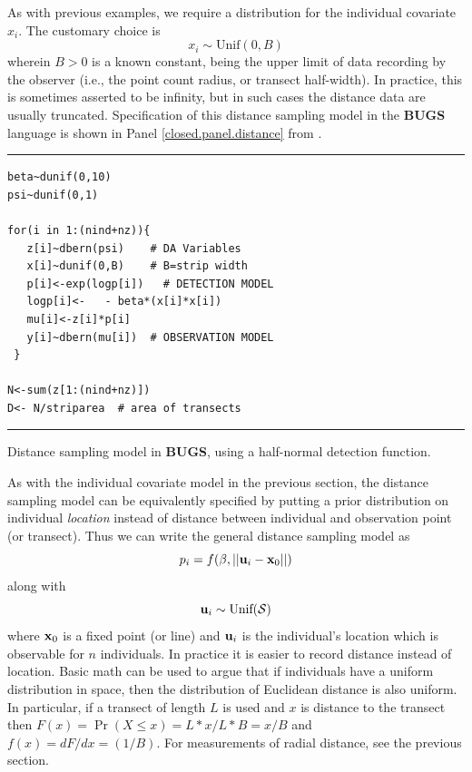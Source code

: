As with previous examples, we require a distribution for the
individual covariate $x_{i}$. The customary choice is
\[
x_{i} \sim \mbox{Unif}(0,B)
\]
wherein $B>0$ is a known constant, being the upper limit of data
recording by the observer (i.e., the point count radius, or transect
half-width). In practice, this is sometimes asserted to be infinity,
but in such cases the distance data are usually truncated.
Specification of this distance sampling model in the {\bf BUGS} language is
shown in Panel \ref{closed.panel.distance} from \citet{royle_dorazio:2008}.


\begin{panel}[htp]
\centering
\rule[0.15in]{\textwidth}{.03in}
\begin{minipage}{5in}
\begin{verbatim}
beta~dunif(0,10)
psi~dunif(0,1)

for(i in 1:(nind+nz)){
   z[i]~dbern(psi)    # DA Variables
   x[i]~dunif(0,B)    # B=strip width
   p[i]<-exp(logp[i])   # DETECTION MODEL
   logp[i]<-   - beta*(x[i]*x[i])
   mu[i]<-z[i]*p[i]
   y[i]~dbern(mu[i])  # OBSERVATION MODEL
 }

N<-sum(z[1:(nind+nz)])
D<- N/striparea  # area of transects
\end{verbatim}
\end{minipage}
\rule[-0.15in]{\textwidth}{.03in}
\caption{Distance sampling model in {\bf BUGS}, using a half-normal
detection function.}
\label{closed.panel.distance}
\end{panel}

As with the individual covariate model in the previous section, the
distance sampling model can be equivalently specified by putting a
prior distribution on individual {\it location} instead of distance
between individual and observation point (or transect).  Thus we can
write the general distance sampling model as
\[
p_{i} = f(\beta,||{\bf u}_{i} - {\bf x}_0||)
\]
along with
\[
 {\bf u}_{i} \sim \mbox{Unif}({\cal S})
\]
where ${\bf x}_{0}$ is a fixed point (or line) and ${\bf u}_{i}$ is
the individual's location which is observable for $n$ individuals. In
practice it is easier to record distance instead of location.  Basic
math can be used to argue that if individuals have a uniform
distribution in space, then the distribution of Euclidean distance is
also uniform. In particular, if a transect of length $L$ is used and $x$
is distance to the transect then $F(x) = \Pr(X\le x) = L*x/L*B = x/B$ and
$f(x) = dF/dx = (1/B)$. For measurements of radial distance, see the
previous section.

